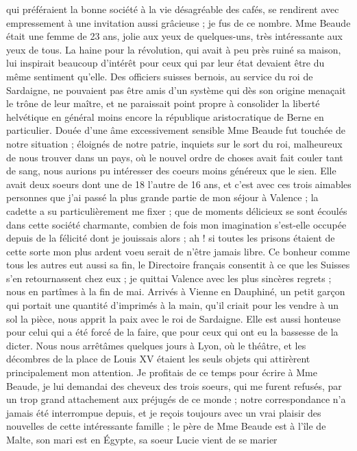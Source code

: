 \documentclass[12pt]{article}
\begin{document}
 qui préféraient la bonne société à la vie désagréable
des cafés, se rendirent avec empressement à une invitation aussi grâcieuse ; je fus de ce nombre.
Mme Beaude était une femme de 23 ans, jolie aux yeux de quelques-uns, très intéressante aux yeux de
tous. La haine pour la révolution, qui avait à peu près ruiné sa maison, lui inspirait beaucoup
d’intérêt pour ceux qui par leur état devaient être du même sentiment qu’elle. Des officiers suisses
bernois, au service du roi de Sardaigne, ne pouvaient pas être amis d’un système qui dès son origine
menaçait le trône de leur maître, et ne paraissait point propre à consolider la liberté helvétique
en général moins encore la république aristocratique de Berne en particulier. Douée d’une âme
excessivement sensible Mme Beaude fut touchée de notre situation ; éloignés de notre patrie,
inquiets sur le sort du roi, malheureux de nous trouver dans un pays, où le nouvel ordre de choses
avait fait couler tant de sang, nous aurions pu intéresser des coeurs moins généreux que le sien.
Elle avait deux soeurs dont une de 18 l’autre de 16 ans, et c’est avec ces trois aimables personnes
que j’ai passé la plus grande partie de mon séjour à Valence ; la cadette a su particulièrement me
fixer ; que de moments délicieux se sont écoulés dans cette société charmante, combien de fois mon
imagination s’est-elle occupée depuis de la félicité dont je jouissais alors ; ah ! si toutes les
prisons étaient de cette sorte mon plus ardent voeu serait de n’être jamais libre. Ce bonheur comme
tous les autres eut aussi sa fin, le Directoire français consentit à ce que les Suisses s’en
retournassent chez eux ; je quittai Valence avec les plus sincères regrets ; nous en partîmes à la
fin de mai. Arrivés à Vienne en Dauphiné, un petit garçon qui portait une quantité d’imprimés à la
main, qu’il criait pour les vendre à un sol la pièce, nous apprit la paix avec le roi de Sardaigne.
Elle est aussi honteuse pour celui qui a été forcé de la faire, que pour ceux qui ont eu la bassesse
de la dicter. Nous nous arrêtâmes quelques jours à Lyon, où le théâtre, et les décombres de la place
de Louis XV étaient les seuls objets qui attirèrent principalement mon attention. Je profitais de ce
temps pour écrire à Mme Beaude, je lui demandai des cheveux des trois soeurs, qui me furent refusés,
par un trop grand attachement aux préjugés de ce monde ; notre correspondance n’a jamais été
interrompue depuis, et je reçois toujours avec un vrai plaisir des nouvelles de cette intéressante
famille ; le père de Mme Beaude est à l’île de Malte, son mari est en Égypte, sa soeur Lucie vient
de se marier
\end{document}

